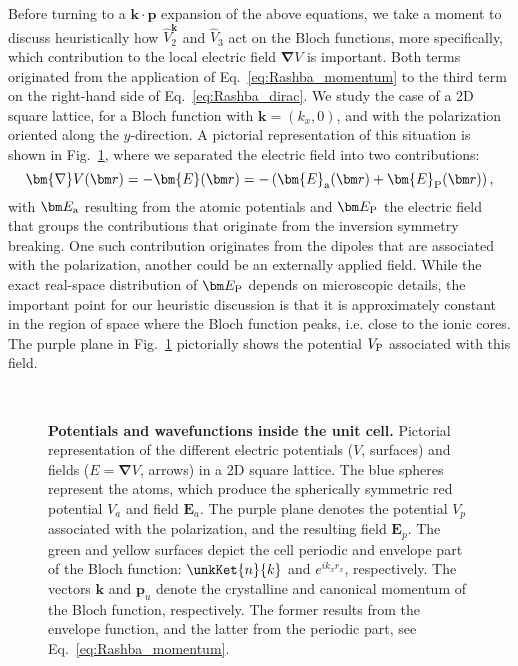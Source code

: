 Before turning to a $\bm{k} \cdot \bm{p}$ expansion of the above equations, we take a moment to discuss heuristically how $\hat{V}^{\bm k}_2$ and $\hat{V}_3$ act on the Bloch functions, more specifically, which contribution to the local electric field $\bm{\nabla}V$ is important.
Both terms originated from the application of Eq.~\eqref{eq:Rashba_momentum} to the third term on the right-hand side of Eq.~\eqref{eq:Rashba_dirac}.
We study the case of a 2D square lattice, for a Bloch function with $\bm k = (k_x, 0)$, and with the polarization oriented along the $y$-direction.
A pictorial representation of this situation is shown in Fig.~\ref{fig:Efield_cell_drawing}, where we separated the electric field into two contributions:
\begin{equation}
	\bm{\nabla} V(\bm r) = - \bm{E}(\bm r) = - \left(\bm{E}_{\rm a}(\bm r) + \bm{E}_{\rm P}(\bm r)\right),
\end{equation}
with $\bm E_{\rm a}$ resulting from the atomic potentials and $\bm E_{\rm P}$ the electric field that groups the contributions that originate from the inversion symmetry breaking. One such contribution originates from the dipoles that are associated with the polarization, another could be an externally applied field.
While the exact real-space distribution of $\bm E_{\rm P}$ depends on microscopic details, the important point for our heuristic discussion is that it is approximately constant in the region of space where the Bloch function peaks, i.e. close to the ionic cores.
The purple plane in Fig.~\ref{fig:Efield_cell_drawing} pictorially shows the potential $V_{\rm P}$ associated with this field.   
\begin{figure}[h]
~\centering
{}\caption{\label{fig:Efield_cell_drawing}{\bf Potentials and wavefunctions inside the unit cell.} Pictorial representation of the different electric potentials ($V$, surfaces) and fields ($E=\bm \nabla V$, arrows) in a 2D square lattice. The blue spheres represent the atoms, which produce the spherically symmetric red potential $V_a$ and field $\bm E_a$. The purple plane denotes the potential $V_p$ associated with the polarization, and the resulting field $\bm E_p$. The green and yellow surfaces depict the cell periodic and envelope part of the Bloch function: $\unkKet{n}{k}$ and $e^{ik_x r_x}$, respectively. The vectors $\bm k$ and $\bm p_u$ denote the crystalline and canonical momentum of the Bloch function, respectively.
The former results from the envelope function, and the latter from the periodic part, see Eq.~\eqref{eq:Rashba_momentum}.}
\end{figure}
    
